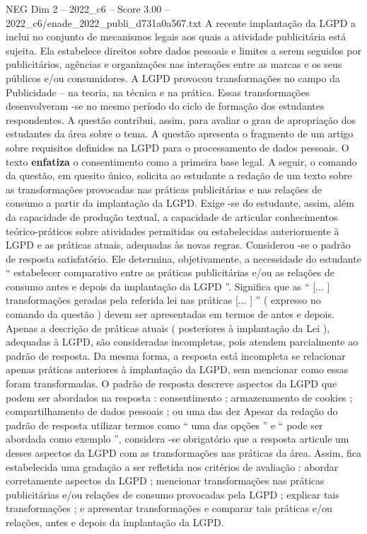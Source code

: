 \begin{textsample}{NEG Dim 2 – 2022\_c6 – Score 3.00 – 2022\_c6/enade\_2022\_publi\_d731a0a567.txt}
A recente implantação da LGPD a inclui no conjunto de mecanismos legais aos quais a atividade publicitária está sujeita.
Ela estabelece direitos sobre dados pessoais e limites a serem seguidos por publicitários, agências e organizações nas interações entre as marcas e os seus públicos e/ou consumidores.
A LGPD provocou transformações no campo da Publicidade – na teoria, na técnica e na prática.
Essas transformações desenvolveram -se no mesmo período do ciclo de formação dos estudantes respondentes.
A questão contribui, assim, para avaliar o grau de apropriação dos estudantes da área sobre o tema.
A questão apresenta o fragmento de um artigo sobre requisitos definidos na LGPD para o processamento de dados pessoais.
O texto \textbf{enfatiza} o consentimento como a primeira base legal.
A seguir, o comando da questão, em quesito único, solicita ao estudante a redação de um texto sobre as transformações provocadas nas práticas publicitárias e nas relações de consumo a partir da implantação da LGPD.
Exige -se do estudante, assim, além da capacidade de produção textual, a capacidade de articular conhecimentos teórico-práticos sobre atividades permitidas ou estabelecidas anteriormente à LGPD e as práticas atuais, adequadas às novas regras.
Considerou -se o padrão de resposta satisfatório.
Ele determina, objetivamente, a necessidade do estudante “ estabelecer comparativo entre as práticas publicitárias e/ou as relações de consumo antes e depois da implantação da LGPD ”.
Significa que as “ [... ] transformações geradas pela referida lei nas práticas [... ] ” ( expresso no comando da questão ) devem ser apresentadas em termos de antes e depois.
Apenas a descrição de práticas atuais ( posteriores à implantação da Lei ), adequadas à LGPD, são consideradas incompletas, pois atendem parcialmente ao padrão de resposta.
Da mesma forma, a resposta está incompleta se relacionar apenas práticas anteriores à implantação da LGPD, sem mencionar como essas foram transformadas.
O padrão de resposta descreve aspectos da LGPD que podem ser abordados na resposta : consentimento ; armazenamento de cookies ; compartilhamento de dados pessoais ; ou uma das dez Apesar da redação do padrão de resposta utilizar termos como “ uma das opções ” e “ pode ser abordada como exemplo ”, considera -se obrigatório que a resposta articule um desses aspectos da LGPD com as transformações nas práticas da área.
Assim, fica estabelecida uma gradação a ser refletida nos critérios de avaliação : abordar corretamente aspectos da LGPD ; mencionar transformações nas práticas publicitárias e/ou relações de consumo provocadas pela LGPD ; explicar tais transformações ; e apresentar transformações e comparar tais práticas e/ou relações, antes e depois da implantação da LGPD.

\end{textsample}
